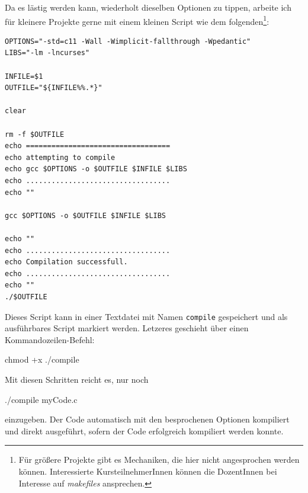 \begin{hintbox}
Da es lästig werden kann, wiederholt dieselben Optionen zu tippen, arbeite ich für kleinere Projekte gerne mit einem kleinen Script wie dem folgenden\footnote{Für größere Projekte gibt es Mechaniken, die hier nicht angesprochen werden können. Interessierte KursteilnehmerInnen können die DozentInnen bei Interesse auf \emph{makefiles} ansprechen.}:
\begin{codebox}
\begin{verbatim}
OPTIONS="-std=c11 -Wall -Wimplicit-fallthrough -Wpedantic"
LIBS="-lm -lncurses"

INFILE=$1
OUTFILE="${INFILE%%.*}"

clear

rm -f $OUTFILE
echo ==================================
echo attempting to compile
echo gcc $OPTIONS -o $OUTFILE $INFILE $LIBS 
echo ..................................
echo ""

gcc $OPTIONS -o $OUTFILE $INFILE $LIBS 

echo ""
echo ..................................
echo Compilation successfull.
echo ..................................
echo ""
./$OUTFILE
\end{verbatim}
\end{codebox}

Dieses Script kann \eg in einer Textdatei mit Namen \texttt{compile} gespeichert und als ausführbares Script markiert werden. Letzeres geschieht über einen Kommandozeilen-Befehl:
\begin{cmdbox}
chmod +x ./compile
\end{cmdbox}

Mit diesen Schritten reicht es, nur noch
\begin{cmdbox}
./compile myCode.c
\end{cmdbox}
einzugeben. Der Code automatisch mit den besprochenen Optionen kompiliert und direkt ausgeführt, sofern der Code erfolgreich kompiliert werden konnte.
\end{hintbox}